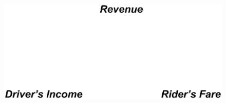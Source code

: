 \documentclass[t]{beamer}
\begin{document}
\begin{frame}
\begin{itemize}
{\begin{figure}
    \includegraphics[width = 0.75\columnwidth]{pricing2.eps}
\end{figure}
}
\end{itemize}
\end{frame}
\end{document}
